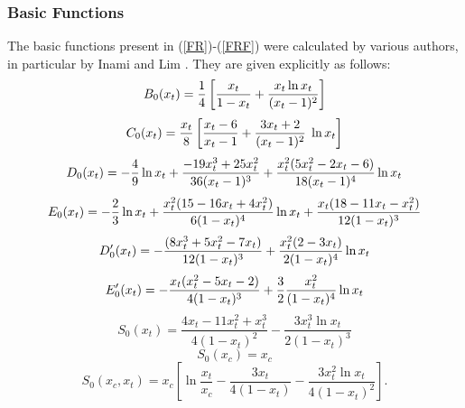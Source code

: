 \documentclass[12pt,rotate]{article}
\begin{document}
\begin{itemize}
\subsubsection{Basic Functions}
The basic functions present in (\ref{FR})-(\ref{FRF}) 
were calculated by various authors, in
particular by Inami and Lim \cite{IL}.  
They are given explicitly as follows:
\begin{equation}\label{BF}
B_0(x_t)={1\over
4}\left[{x_t\over{1-x_t}}+{{x_t\ln x_t}\over{(x_t-1)^2}}\right]
\end{equation}
\begin{equation}\label{C0xt}
C_0(x_t)={x_t\over 8}\left[{{x_t-6}\over{x_t-1}}+{{3x_t+2}
\over{(x_t-1)^2}}\;\ln x_t\right] 
\end{equation}
\begin{equation}
D_0(x_t)=-{4\over9}\ln x_t+{{-19x_t^3+25x_t^2}\over{36(x_t-1)^3}}
+{{x_t^2(5x_t^2-2x_t-6)} \over{18(x_t-1)^4}}\ln x_t
\end{equation}
\begin{equation}\label{E0}
E_0(x_t)=-{2\over 3}\ln x_t+{{x_t^2(15-16x_t+4x_t^2)}\over{6(1-x_t)^4}}
\ln x_t+{{x_t(18-11x_t-x_t^2)} \over{12(1-x_t)^3}}
\end{equation}
\begin{equation}
D'_0(x_t)= -{{(8x_t^3 + 5x_t^2 - 7x_t)}\over{12(1-x_t)^3}}+ 
          {{x_t^2(2-3x_t)}\over{2(1-x_t)^4}}\ln x_t
\end{equation}
\begin{equation}
E'_0(x_t)=-{{x_t(x_t^2-5x_t-2)}\over{4(1-x_t)^3}} + {3\over2}
{{x_t^2}\over{(1 - x_t)^4}} \ln x_t
\end{equation}
\begin{equation}\label{S0}
S_0(x_t)=\frac{4x_t-11x^2_t+x^3_t}{4(1-x_t)^2}-
 \frac{3x^3_t \ln x_t}{2(1-x_t)^3}
\end{equation}
\begin{equation}\label{BFF1}
S_0(x_c)=x_c
\end{equation}
\begin{equation}\label{BFF}
S_0(x_c, x_t)=x_c\left[\ln\frac{x_t}{x_c}-\frac{3x_t}{4(1-x_t)}-
 \frac{3 x^2_t\ln x_t}{4(1-x_t)^2}\right].
\end{equation}


\end{itemize}
\end{document}
